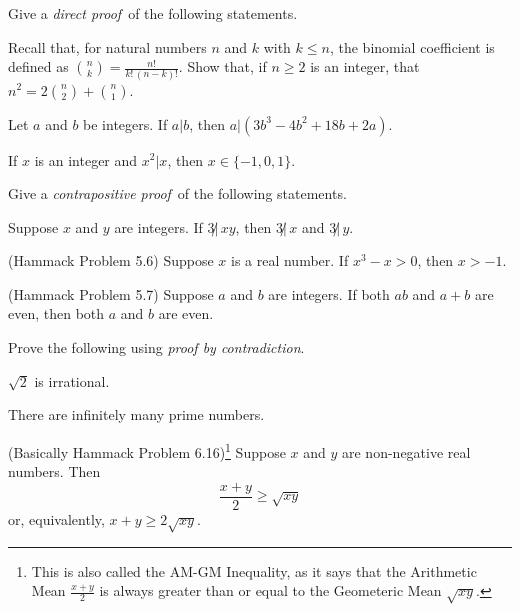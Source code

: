 \documentclass[12pt,letterpaper]{article}
\begin{document}
\thispagestyle{fancy}

\begin{enumerate}
  \Problem Give a \emph{direct proof}\ of the following statements.
  \begin{enumerate}
    \Part  Recall that, for natural numbers $n$ and $k$ with $k\le n$,
    the binomial coefficient is defined as $\binom{n}{k} =
    \frac{n!}{k!\,(n-k)!}$.  Show that, if $n\ge2$ is an integer, that
    $n^2 = 2\binom{n}{2} + \binom{n}{1}$.
    \vfill

    \Part Let $a$ and $b$ be integers. If $a|b$, then
    $a|\left(3b^3-4b^2+18b+2a\right)$.  \vfill

    \Part If $x$ is an integer and $x^2|x$, then $x\in
    \{-1,0,1\}$. 
    \vfill

  \end{enumerate}

  \Problem Give a \emph{contrapositive proof}\ of the following statements. 
  \begin{enumerate}
    \Part Suppose $x$ and $y$ are integers.  If $3\not|\,xy$,
    then $3\not|\,x$ and $3\not|\,y$.
    \vfill

    \Part (Hammack Problem 5.6) Suppose $x$ is a real number.  If $x^3
    -x > 0$, then $x>-1$.
    \vfill

    \Part (Hammack Problem 5.7) Suppose $a$ and $b$ are integers.  If
    both $ab$ and $a+b$ are even, then both $a$ and $b$ are even.
    \vfill
  \end{enumerate}

\end{enumerate}
\newpage

Prove the following using \emph{proof by contradiction}.
\begin{enumerate}
  \Problem $\sqrt{2}$ is irrational.
  \vfill

  \Problem There are infinitely many prime numbers.
  \vfill


  \Problem (Basically Hammack Problem 6.16)\footnote{%
    This is also called the AM-GM Inequality, as it says that the
    Arithmetic Mean $\frac{x+y}{2}$ is always greater than or equal to
    the Geometeric Mean $\sqrt{xy}$.}   %
  Suppose $x$ and $y$ are non-negative real numbers.  Then
  \begin{equation*}
    \frac{x+y}{2} \ge \sqrt{xy}
  \end{equation*}
  or, equivalently, $x+y\ge 2\sqrt{xy}$.  
  \vfill
\end{enumerate}
\end{document}
